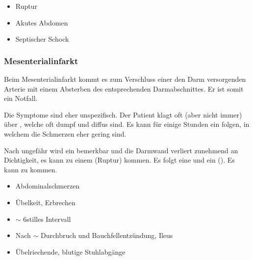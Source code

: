 {{\bigskip

}
{\begin{itemize}
  \item Ruptur
  \item Akutes Abdomen
  \item Septischer Schock
\end{itemize}}
{}
{}
{}




\subsubsection{Mesenterialinfarkt}
\label{topic:mesenterialinfarkt}

Beim Mesenterialinfarkt kommt es zum Verschluss einer den
Darm versorgenden Arterie
mit einem Absterben des entsprechenden Darmabschnittes. Er
ist somit ein 
Notfall.

{Die Symptome sind eher unspezifisch. Der Patient klagt oft
(aber nicht immer) über , welche
oft dumpf und diffus sind. Es kann für einige Stunden ein
 folgen, in welchem die Schmerzen eher
gering sind. 

Nach ungefähr \Hour* wird ein
 bemerkbar und die Darmwand verliert
zunehmend an Dichtigkeit, es kann zu einem 
(Ruptur) kommen. Es folgt eine  und
ein  (). Es kann zu
 kommen.
\cite{SiewertChirurgie8-06-Gefaesschirurgie}
% 

}
{\begin{itemize}
  \item Abdominalschmerzen
  \item Übelkeit, Erbrechen
  \item $\sim$ 6\Hour* stilles Intervall
  \item Nach $\sim$ \Hour* Durchbruch und
  Bauchfellentzündung, Ileus
  \item Übelriechende, blutige Stuhlabgänge
\end{itemize}}
{}
{}
{}




}
